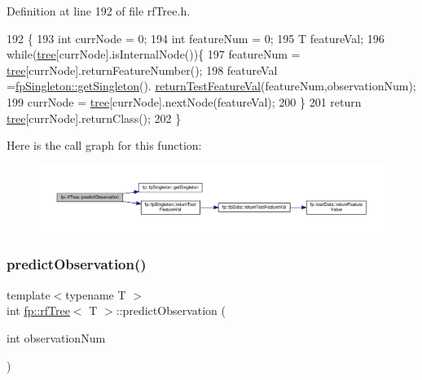 Definition at line 192 of file rf\+Tree.\+h.


\begin{DoxyCode}
192                                                           \{
193                     \textcolor{keywordtype}{int} currNode = 0;
194                     \textcolor{keywordtype}{int} featureNum = 0;
195                     T featureVal;
196                     \textcolor{keywordflow}{while}(\hyperlink{classfp_1_1rfTree_a1d5c209715f4044a85878c17e2b3ee53}{tree}[currNode].isInternalNode())\{
197                         featureNum = \hyperlink{classfp_1_1rfTree_a1d5c209715f4044a85878c17e2b3ee53}{tree}[currNode].returnFeatureNumber();
198                         featureVal =\hyperlink{classfp_1_1fpSingleton_a8bdae77b68521003e3fc630edec2e240}{fpSingleton::getSingleton}().
      \hyperlink{classfp_1_1fpSingleton_ad74b421d65b17ba924244bff31fc9db6}{returnTestFeatureVal}(featureNum,observationNum);
199                         currNode = \hyperlink{classfp_1_1rfTree_a1d5c209715f4044a85878c17e2b3ee53}{tree}[currNode].nextNode(featureVal);
200                     \}
201                     \textcolor{keywordflow}{return} \hyperlink{classfp_1_1rfTree_a1d5c209715f4044a85878c17e2b3ee53}{tree}[currNode].returnClass();
202                 \}
\end{DoxyCode}
Here is the call graph for this function\+:
\nopagebreak
\begin{figure}[H]
\begin{center}
\leavevmode
\includegraphics[width=350pt]{classfp_1_1rfTree_aad66c44e2062c163b1560f9bf1bd759f_cgraph}
\end{center}
\end{figure}
\mbox{\label{classfp_1_1rfTree_aad66c44e2062c163b1560f9bf1bd759f}} 
\subsubsection{\texorpdfstring{predict\+Observation()}{predictObservation()}\hspace{0.1cm}{\footnotesize\ttfamily [2/2]}}
{\footnotesize\ttfamily template$<$typename T $>$ \\
int \hyperlink{classfp_1_1rfTree}{fp\+::rf\+Tree}$<$ T $>$\+::predict\+Observation (\begin{DoxyParamCaption}\item[{int}]{observation\+Num }\end{DoxyParamCaption})\hspace{0.3cm}{\ttfamily [inline]}}




